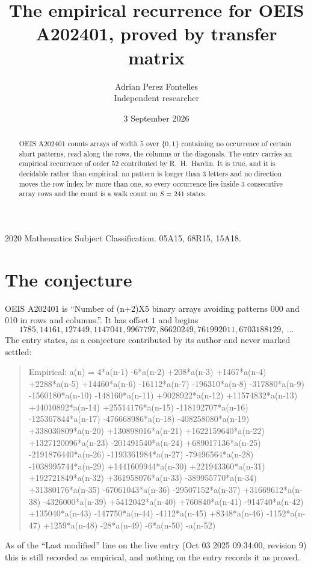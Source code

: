 \documentclass[11pt,a4paper]{article}
\title{The empirical recurrence for OEIS A202401, proved by transfer matrix}
\author{Adrian Perez Fontelles\\ \small Independent researcher}
\date{3 September 2026}
\theoremstyle{plain}
\theoremstyle{definition}
\begin{document}
\maketitle

\begin{abstract}
OEIS A202401 counts arrays of width $5$ over $\{0,1\}$ containing no occurrence of certain short
patterns, read along the rows, the columns or the diagonals. The entry carries an empirical
recurrence of order $52$ contributed by R.~H.~Hardin. It is true, and it is decidable
rather than empirical: no pattern is longer than $3$ letters and no direction moves the row
index by more than one, so every occurrence lies inside $3$ consecutive array rows and the
count is a walk count on $S=241$ states.
\end{abstract}

\noindent\small 2020 Mathematics Subject Classification. 05A15, 68R15, 15A18.\normalsize

\section{The conjecture}

OEIS A202401 is ``Number of (n+2)X5 binary arrays avoiding patterns 000 and 010 in rows and columns.''. It has offset $1$ and begins
\[
1785, 14161, 127449, 1147041, 9967797, 86620249, 761992011, 6703188129,\ \dots
\]
The entry states, as a conjecture contributed by its author and never marked settled:
\begin{quote}
Empirical: a(n) = 4*a(n-1) -6*a(n-2) +208*a(n-3) +1467*a(n-4) +2288*a(n-5) +14460*a(n-6) -16112*a(n-7) -196310*a(n-8) -317880*a(n-9) -1560180*a(n-10) -148160*a(n-11) +9028922*a(n-12) +11574832*a(n-13) +44010892*a(n-14) +25514176*a(n-15) -118192707*a(n-16) -125367844*a(n-17) -476668986*a(n-18) -408258080*a(n-19) +338030809*a(n-20) +130898016*a(n-21) +1622159640*a(n-22) +1327120096*a(n-23) -201491540*a(n-24) +689017136*a(n-25) -2191876440*a(n-26) -1193361984*a(n-27) -79496564*a(n-28) -1038995744*a(n-29) +1441609944*a(n-30) +221943360*a(n-31) +192721849*a(n-32) +361958076*a(n-33) -389955770*a(n-34) +31380176*a(n-35) -67061043*a(n-36) -29507152*a(n-37) +31669612*a(n-38) -4326000*a(n-39) +5412042*a(n-40) +760840*a(n-41) -914740*a(n-42) +135040*a(n-43) -147750*a(n-44) -4112*a(n-45) +8348*a(n-46) -1152*a(n-47) +1259*a(n-48) -28*a(n-49) -6*a(n-50) -a(n-52)
\end{quote}
As of the ``Last modified'' line on the live entry (Oct 03 2025 09:34:00, revision 9) this is still
recorded as empirical, and nothing on the entry records it as proved.
\end{document}

